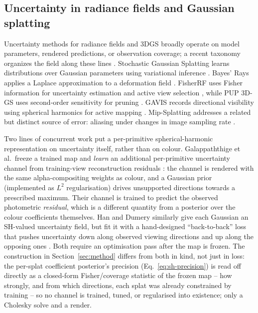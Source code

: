 \documentclass[letterpaper,10pt,conference]{ieeeconf}
\begin{document}
\subsection{Uncertainty in radiance fields and Gaussian splatting}

Uncertainty methods for radiance fields and 3DGS broadly operate on model
parameters, rendered predictions, or observation coverage; a recent taxonomy
organizes the field along these lines \cite{klasson2024sources}. Stochastic
Gaussian Splatting learns distributions over Gaussian parameters using
variational inference \cite{savant2024}. Bayes' Rays applies a Laplace
approximation to a deformation field \cite{goli2024}. FisherRF uses Fisher
information for uncertainty estimation and active view selection
\cite{jiang2024}, while PUP 3D-GS uses second-order sensitivity for pruning
\cite{hanson2025}. GAVIS records directional visibility using spherical
harmonics for active mapping \cite{xue2026}. Mip-Splatting addresses a related
but distinct source of error: aliasing under changes in image sampling rate
\cite{yu2024}.

Two lines of concurrent work put a per-primitive spherical-harmonic
representation on uncertainty itself, rather than on colour. Galappaththige
et al.\ freeze a trained map and \emph{learn} an additional per-primitive
uncertainty channel from training-view reconstruction residuals
\cite{galappaththige2026predictive}: the channel is rendered with the same
alpha-compositing weights as colour, and a Gaussian prior (implemented as
$L^2$ regularisation) drives unsupported directions towards a prescribed
maximum. Their channel is trained to predict the observed photometric
\emph{residual}, which is a different quantity from a posterior over the
colour coefficients themselves. Han and Dumery similarly give each Gaussian
an SH-valued uncertainty field, but fit it with a hand-designed
``back-to-back'' loss that pushes uncertainty down along observed viewing
directions and up along the opposing ones \cite{han2025viewdependent}. Both
require an optimisation pass after the map is frozen. The construction in
Section~\ref{sec:method} differs from both in kind, not just in loss: the
per-splat coefficient posterior's precision (Eq.~\eqref{eq:sh-precision}) is
read off directly as a closed-form Fisher/coverage statistic of the frozen
map -- how strongly, and from which directions, each splat was already
constrained by training -- so no channel is trained, tuned, or regularised
into existence; only a Cholesky solve and a render.
\end{document}
